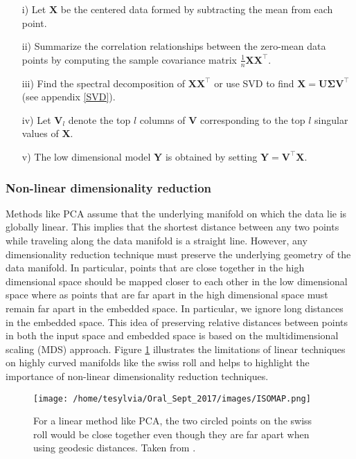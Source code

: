 \begin{itemize}
\item[i)] Let $\textbf{X}$ be the centered data formed by subtracting the mean from each point.
\item[ii)] Summarize the correlation relationships between the zero-mean data points by computing the sample covariance matrix $\frac{1}{n}\textbf{XX}^{\top}.$
\item[iii)] Find the spectral decomposition of $\textbf{XX}^{\top}$ or 
use SVD to find $\textbf{X} = \bm{U\Sigma V^{\top}}$  (see appendix \ref{SVD}).
\item[iv)] Let $\bm{V}_{l}$ denote the top $l$ columns of $\textbf{V}$ corresponding to the  top $l$ singular values of $\textbf{X}$.
\item[v)] The low dimensional model $\textbf{Y}$ is obtained by setting 
$\textbf{Y} = \textbf{V}^{\top}\textbf{X}$.
\end{itemize}

\subsubsection{Non-linear dimensionality reduction}

Methods like PCA assume that the underlying manifold on which the data lie is globally linear. This implies that the shortest distance between any two points while traveling along the data manifold is a straight line.
However, any dimensionality reduction technique must preserve the underlying geometry of the data manifold. In particular, points that are close together in the high dimensional space should be mapped closer to each other in the low dimensional space where as points that are far apart in the high dimensional space must remain far apart in the embedded space. In particular, we ignore long distances in the embedded space. This idea of preserving relative distances between points
in both the input space and embedded space is based on the multidimensional scaling (MDS) approach.
Figure \ref{fig:Swiss roll} illustrates the limitations of linear techniques on highly curved manifolds like the swiss roll and helps to highlight the importance of non-linear dimensionality reduction techniques.

\begin{figure}[h]
\centering
\texttt{[image: /home/tesylvia/Oral\_Sept\_2017/images/ISOMAP.png]}
\caption{For a linear method like PCA, the two circled points on the swiss roll would be close together even though they are far apart when using geodesic distances. Taken from \cite{TenenbaumJB2000Aggf}.}
      \label{fig:Swiss roll}
\end{figure}


